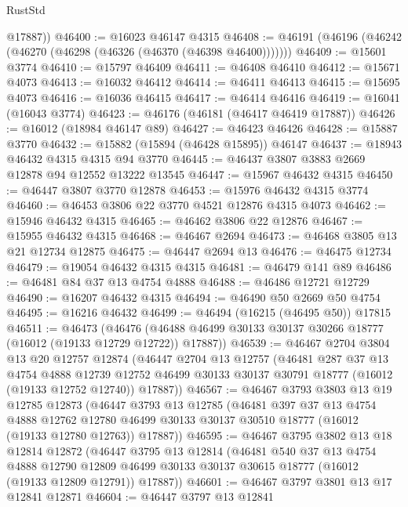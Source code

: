 \begin{lexlean}{RustStd}
\begin{coremodule}
        @17887))
@46400 := @16023 @46147 @4315
@46408 := @46191 (@46196 (@46242 (@46270 (@46298 (@46326 (@46370 (@46398 @46400)))))))
@46409 := @15601 @3774
@46410 := @15797 @46409
@46411 := @46408 @46410
@46412 := @15671 @4073
@46413 := @16032 @46412
@46414 := @46411 @46413
@46415 := @15695 @4073
@46416 := @16036 @46415
@46417 := @46414 @46416
@46419 := @16041 (@16043 @3774)
@46423 := @46176 (@46181 (@46417 @46419 @17887))
@46426 := @16012 (@18984 @46147 @89)
@46427 := @46423 @46426
@46428 := @15887 @3770
@46432 := @15882 (@15894 (@46428 @15895)) @46147
@46437 := @18943 @46432 @4315 @4315 @94 @3770
@46445 := @46437 @3807 @3883 @2669 @12878 @94 @12552 @13222 @13545
@46447 := @15967 @46432 @4315
@46450 := @46447 @3807 @3770 @12878
@46453 := @15976 @46432 @4315 @3774
@46460 := @46453 @3806 @22 @3770 @4521 @12876 @4315 @4073
@46462 := @15946 @46432 @4315
@46465 := @46462 @3806 @22 @12876
@46467 := @15955 @46432 @4315
@46468 := @46467 @2694
@46473 := @46468 @3805 @13 @21 @12734 @12875
@46475 := @46447 @2694 @13
@46476 := @46475 @12734
@46479 := @19054 @46432 @4315 @4315
@46481 := @46479 @141 @89
@46486 := @46481 @84 @37 @13 @4754 @4888
@46488 := @46486 @12721 @12729
@46490 := @16207 @46432 @4315
@46494 := @46490 @50 @2669 @50 @4754
@46495 := @16216 @46432
@46499 := @46494 (@16215 (@46495 @50)) @17815
@46511 := @46473
    (@46476 (@46488 @46499 @30133 @30137 @30266 @18777 (@16012 (@19133 @12729 @12722)) @17887))
@46539 := @46467
    @2704
    @3804
    @13
    @20
    @12757
    @12874
    (@46447
      @2704
      @13
      @12757
      (@46481
        @287
        @37
        @13
        @4754
        @4888
        @12739
        @12752
        @46499
        @30133
        @30137
        @30791
        @18777
        (@16012 (@19133 @12752 @12740))
        @17887))
@46567 := @46467
    @3793
    @3803
    @13
    @19
    @12785
    @12873
    (@46447
      @3793
      @13
      @12785
      (@46481
        @397
        @37
        @13
        @4754
        @4888
        @12762
        @12780
        @46499
        @30133
        @30137
        @30510
        @18777
        (@16012 (@19133 @12780 @12763))
        @17887))
@46595 := @46467
    @3795
    @3802
    @13
    @18
    @12814
    @12872
    (@46447
      @3795
      @13
      @12814
      (@46481
        @540
        @37
        @13
        @4754
        @4888
        @12790
        @12809
        @46499
        @30133
        @30137
        @30615
        @18777
        (@16012 (@19133 @12809 @12791))
        @17887))
@46601 := @46467 @3797 @3801 @13 @17 @12841 @12871
@46604 := @46447 @3797 @13 @12841

\end{coremodule}
\end{lexlean}
